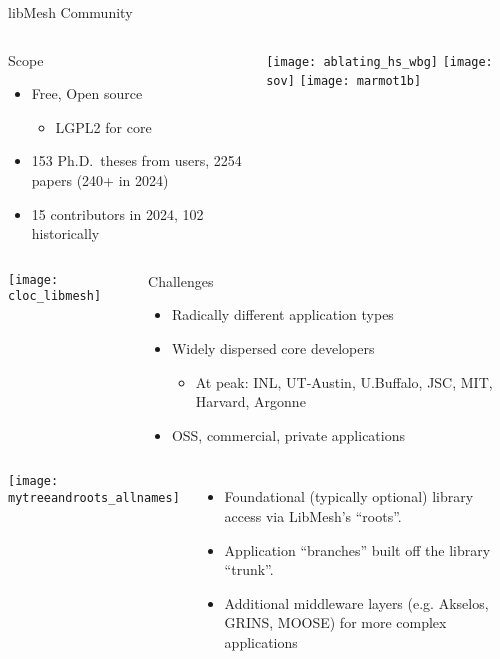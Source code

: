 \begin{frame}{libMesh Community}
\begin{columns}
\begin{block}{Scope}
\begin{itemize}
\item Free, Open source
\begin{itemize}
\item LGPL2 for core
\end{itemize}
\item 153 Ph.D.\ theses from users, 2254 papers (240+ in 2024)
\item 15 contributors in 2024, 102 historically
\end{itemize}
\end{block}

\texttt{[image: ablating\_hs\_wbg]}
\texttt{[image: sov]}
\texttt{[image: marmot1b]}
\end{columns}

\begin{columns}
\texttt{[image: cloc\_libmesh]}

\begin{block}{Challenges}
\begin{itemize}
\item Radically different application types
\item Widely dispersed core developers
\begin{itemize}
\item At peak: INL, UT-Austin, U.Buffalo, JSC, MIT, Harvard, Argonne
\end{itemize}
\item OSS, commercial, private applications
\end{itemize}
\end{block}
\end{columns}

\end{frame}


\begin{frame}[t]
  \begin{columns}
    \begin{center}
      \texttt{[image: mytreeandroots\_allnames]}
    \end{center}
    \begin{itemize}
      \item Foundational (typically optional) library access via LibMesh's ``roots''.
      \item Application ``branches'' built off the library ``trunk''.
      \item Additional middleware layers (e.g. Akselos, GRINS, MOOSE) for more complex applications
    \end{itemize}
  \end{columns}

\end{frame}



